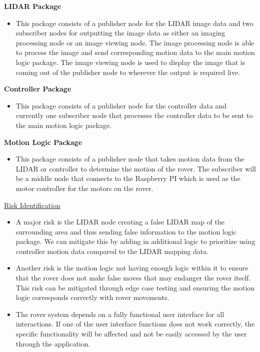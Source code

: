 \documentclass[a4paper, 10pt]{article}
\begin{document}
\textbf{LIDAR Package}
\begin{itemize}
\item
	This package consists of a publisher node for the LIDAR image data and two subscriber nodes for outputting the image data as either an imaging processing node or an image viewing node. The image processing node is able to process the image and send corresponding motion data to the main motion logic package. The image viewing node is used to display the image that is coming out of the publisher node to wherever the output is required live.
\end{itemize}

\textbf{Controller Package}

\begin{itemize}
\item
	This package consists of a publisher node for the controller data and currently one subscriber node that processes the controller data to be sent to the main motion logic package. 
\end{itemize}

\textbf{Motion Logic Package}

\begin{itemize}
\item
	This package consists of a publisher node that takes motion data from the LIDAR or controller to determine the motion of the rover. The subscriber will be a middle node that connects to the Raspberry PI which is used as the motor controller for the motors on the rover. 
\end{itemize}

\underline{Risk Identification}

\begin{itemize}
\item
	A major risk is the LIDAR node creating a false LIDAR map of the surrounding area and thus sending false information to the motion logic package. We can mitigate this by adding in additional logic to prioritize using controller motion data compared to the LIDAR mapping data. 

\item
	Another risk is the motion logic not having enough logic within it to ensure that the rover does not make false moves that may endanger the rover itself. This risk can be mitigated through edge case testing and ensuring the motion logic corresponds correctly with rover movements. 

\item
	The rover system depends on a fully functional user interface for all interactions. If one of the user interface functions does not work correctly, the specific functionality will be affected and not be easily accessed by the user through the application. 
\end{itemize}
\end{document}
